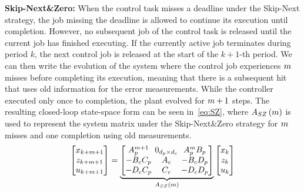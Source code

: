 \textbf{Skip-Next\&Zero: }%
%
When the control task misses a deadline under the Skip-Next
strategy, the job missing the deadline is allowed to continue its
execution until completion. However, no subsequent job of the
control task is released until the current job has finished
executing. If the currently active job terminates during period
$k$, the next control job is released at the start of the
$k+1$-th period. We can then write the evolution of the system 
where the control job experiences $m$ misses before
completing its execution, meaning that there is a subsequent hit
that uses old information for the error measurements. While the
controller executed only once to completion, the plant evolved
for $m+1$ steps. The resulting closed-loop state-space
form can be seen in~\eqref{eq:SZ}, where
$A_{SZ}\left(m\right)$ is used to represent the system matrix
under the Skip-Next\&Zero strategy for $m$ misses and
one completion using old measurements.
%
\begin{equation}
\setlength\arraycolsep{2pt}
\label{eq:SZ}
    \begin{bmatrix}
        x_{k+\nummisses+1} \\
        z_{k+\nummisses+1} \\
        u_{k+\nummisses+1}
    \end{bmatrix} = 
    \underbrace{\begin{bmatrix}
        A_p^{\nummisses+1}  & 0_{\numstatesplant \times \numstatesctl}  & A_p^\nummisses B_p \\
        -B_cC_p             & A_c                                       & -B_cD_p \\
        -D_cC_p             & C_c                                       & -D_cD_p
    \end{bmatrix}}_{A_{SZ}\funof{\nummisses}}
    \begin{bmatrix}
        x_{k} \\
        z_{k} \\
        u_{k}
    \end{bmatrix}
\end{equation}

